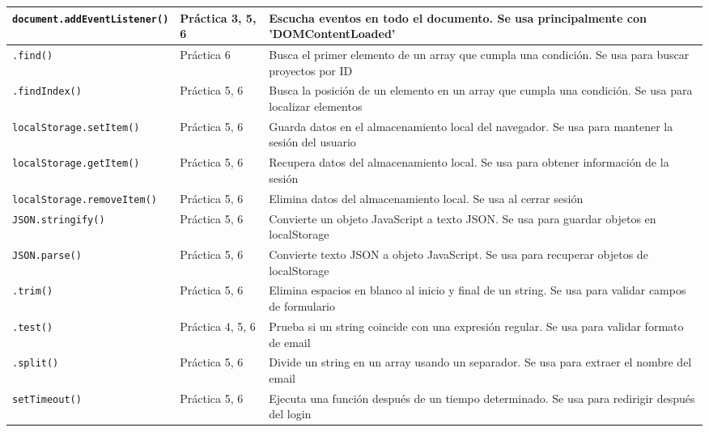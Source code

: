 \documentclass[12pt,a4paper]{article}
\begin{document}
\begin{longtable}{|p{3cm}|p{4cm}|p{8cm}|}
\texttt{document.addEventListener()} & Práctica 3, 5, 6 & Escucha eventos en todo el documento. Se usa principalmente con 'DOMContentLoaded' \\
\hline

\texttt{.find()} & Práctica 6 & Busca el primer elemento de un array que cumpla una condición. Se usa para buscar proyectos por ID \\
\hline

\texttt{.findIndex()} & Práctica 5, 6 & Busca la posición de un elemento en un array que cumpla una condición. Se usa para localizar elementos \\
\hline

\texttt{localStorage.setItem()} & Práctica 5, 6 & Guarda datos en el almacenamiento local del navegador. Se usa para mantener la sesión del usuario \\
\hline

\texttt{localStorage.getItem()} & Práctica 5, 6 & Recupera datos del almacenamiento local. Se usa para obtener información de la sesión \\
\hline

\texttt{localStorage.removeItem()} & Práctica 5, 6 & Elimina datos del almacenamiento local. Se usa al cerrar sesión \\
\hline

\texttt{JSON.stringify()} & Práctica 5, 6 & Convierte un objeto JavaScript a texto JSON. Se usa para guardar objetos en localStorage \\
\hline

\texttt{JSON.parse()} & Práctica 5, 6 & Convierte texto JSON a objeto JavaScript. Se usa para recuperar objetos de localStorage \\
\hline

\texttt{.trim()} & Práctica 5, 6 & Elimina espacios en blanco al inicio y final de un string. Se usa para validar campos de formulario \\
\hline

\texttt{.test()} & Práctica 4, 5, 6 & Prueba si un string coincide con una expresión regular. Se usa para validar formato de email \\
\hline

\texttt{.split()} & Práctica 5, 6 & Divide un string en un array usando un separador. Se usa para extraer el nombre del email \\
\hline

\texttt{setTimeout()} & Práctica 5, 6 & Ejecuta una función después de un tiempo determinado. Se usa para redirigir después del login \\
\hline


\end{longtable}
\end{document}
